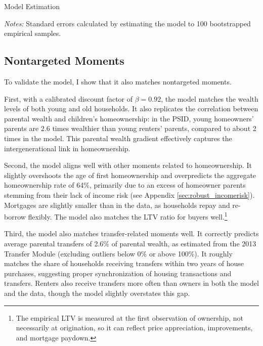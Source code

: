 \documentclass[12pt]{article}
\begin{document}
\begin{table}[tb]
	\center 
	\begin{threeparttable}
	\caption{Model Estimation}\label{tab:esttable}
		
	\end{threeparttable}
	{\begin{footnotesize}\begin{flushleft}\vspace{-0.1in}
		\textit{Notes:} Standard errors calculated by estimating the model to 100 bootstrapped empirical samples.
		\end{flushleft}\end{footnotesize}}
\end{table}
\subsection{Nontargeted Moments}\label{sec:externalval}
To validate the model, I show that it also matches nontargeted moments. 

First, with a calibrated discount factor of $\beta=0.92$, the model matches the wealth levels of both young and old households. It also replicates the correlation between parental wealth and children's homeownership: in the PSID, young homeowners' parents are 2.6 times wealthier than young renters' parents, compared to about 2 times in the model. This parental wealth gradient effectively captures the intergenerational link in homeownership.

Second, the model aligns well with other moments related to homeownership. It slightly overshoots the age of first homeownership and overpredicts the aggregate homeownership rate of 64\%, primarily due to an excess of homeowner parents stemming from their lack of income risk (see Appendix \ref{sec:robust_incomerisk}). Mortgages are slightly smaller than in the data, as households repay and re-borrow flexibly. The model also matches the LTV ratio for buyers well.\footnote{The empirical LTV is measured at the first observation of ownership, not necessarily at origination, so it can reflect price appreciation, improvements, and mortgage paydown.}

Third, the model also matches transfer-related moments well. It correctly predicts average parental transfers of 2.6\% of parental wealth, as estimated from the 2013 Transfer Module (excluding outliers below 0\% or above 100\%). It roughly matches the share of households receiving transfers within two years of house purchases, suggesting proper synchronization of housing transactions and transfers. Renters also receive transfers more often than owners in both the model and the data, though the model slightly overstates this gap.
\end{document}
